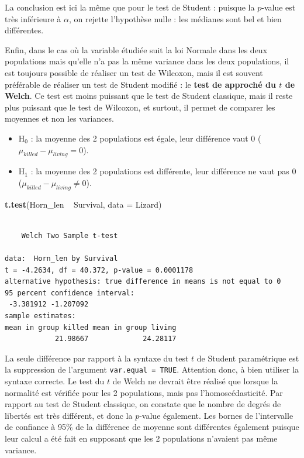 \documentclass[a4paperpaper,]{article}
\newenvironment{Shaded}{\begin{snugshade}}{\end{snugshade}}
\newcommand{\DataTypeTok}[1]{\textcolor[rgb]{0.00,0.34,0.68}{#1}}
\newcommand{\KeywordTok}[1]{\textcolor[rgb]{0.12,0.11,0.11}{\textbf{#1}}}
\newcommand{\NormalTok}[1]{\textcolor[rgb]{0.12,0.11,0.11}{#1}}
\newcommand{\OperatorTok}[1]{\textcolor[rgb]{0.12,0.11,0.11}{#1}}
\newcommand{\StringTok}[1]{\textcolor[rgb]{0.75,0.01,0.01}{#1}}
\providecommand{\tightlist}{%
  \setlength{\itemsep}{0pt}\setlength{\parskip}{0pt}}
\begin{document}
La conclusion est ici la même que pour le test de Student : puisque la \(p\)-value est très inférieure à \(\alpha\), on rejette l'hypothèse nulle : les médianes sont bel et bien différentes.

Enfin, dans le cas où la variable étudiée suit la loi Normale dans les deux populations mais qu'elle n'a pas la même variance dans les deux populations, il est toujours possible de réaliser un test de Wilcoxon, mais il est souvent préférable de réaliser un test de Student modifié : le \textbf{test de approché du \(t\) de Welch}. Ce test est moins puissant que le test de Student classique, mais il reste plus puissant que le test de Wilcoxon, et surtout, il permet de comparer les moyennes et non les variances.

\begin{itemize}
\tightlist
\item
  H\(_0\) : la moyenne des 2 populations est égale, leur différence vaut 0 (\(\mu_{killed}-\mu_{living} = 0\)).
\item
  H\(_1\) : la moyenne des 2 populations est différente, leur différence ne vaut pas 0 (\(\mu_{killed}-\mu_{living} \neq 0\)).
\end{itemize}

\begin{Shaded}
\begin{Highlighting}[]
\KeywordTok{t.test}\NormalTok{(Horn_len }\OperatorTok{~}\StringTok{ }\NormalTok{Survival, }\DataTypeTok{data =}\NormalTok{ Lizard)}
\end{Highlighting}
\end{Shaded}

\begin{verbatim}

    Welch Two Sample t-test

data:  Horn_len by Survival
t = -4.2634, df = 40.372, p-value = 0.0001178
alternative hypothesis: true difference in means is not equal to 0
95 percent confidence interval:
 -3.381912 -1.207092
sample estimates:
mean in group killed mean in group living 
            21.98667             24.28117 
\end{verbatim}

La seule différence par rapport à la syntaxe du test \(t\) de Student paramétrique est la suppression de l'argument \texttt{var.equal\ =\ TRUE}. Attention donc, à bien utiliser la syntaxe correcte. Le test du \(t\) de Welch ne devrait être réalisé que lorsque la normalité est vérifiée pour les 2 populations, mais pas l'homoscédasticité. Par rapport au test de Student classique, on constate que le nombre de degrés de libertés est très différent, et donc la \(p\)-value également. Les bornes de l'intervalle de confiance à 95\% de la différence de moyenne sont différentes également puisque leur calcul a été fait en supposant que les 2 populations n'avaient pas même variance.
\end{document}
